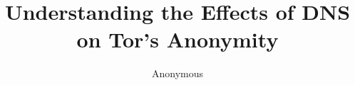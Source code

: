 \documentclass[conference]{IEEEtran}
\begin{document}
\title{Understanding the Effects of DNS on Tor's Anonymity}

\author{Anonymous}


\maketitle





















% 



\balance


\end{document}
